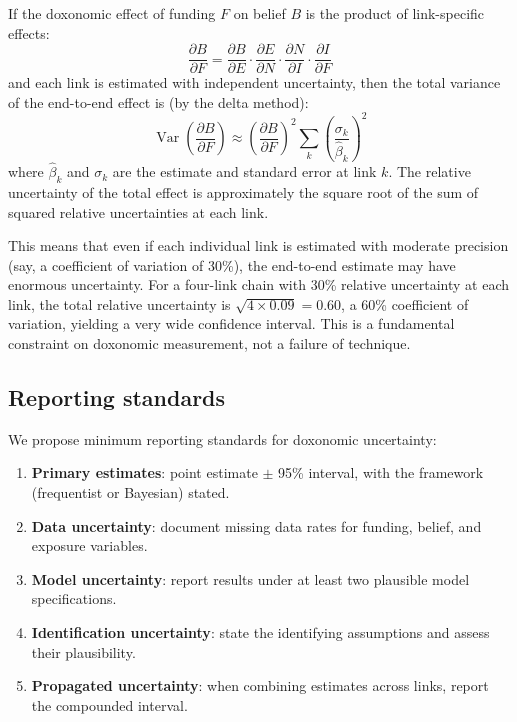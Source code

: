 \begin{proposition}
\label{prop:uncertainty-propagation}
If the doxonomic effect of funding $F$ on belief $B$ is the product of link-specific effects:
\[
  \frac{\partial B}{\partial F} = \frac{\partial B}{\partial E} \cdot \frac{\partial E}{\partial N} \cdot \frac{\partial N}{\partial I} \cdot \frac{\partial I}{\partial F}
\]
and each link is estimated with independent uncertainty, then the total variance of the end-to-end effect is (by the delta method):
\[
  \operatorname{Var}\!\left(\frac{\partial B}{\partial F}\right) \approx \left(\frac{\partial B}{\partial F}\right)^2 \sum_{k} \left(\frac{\sigma_k}{\hat{\beta}_k}\right)^2
\]
where $\hat{\beta}_k$ and $\sigma_k$ are the estimate and standard error at link $k$.
The relative uncertainty of the total effect is approximately the square root of the sum of squared relative uncertainties at each link.
\end{proposition}

This means that even if each individual link is estimated with moderate precision (say, a coefficient of variation of 30\%), the end-to-end estimate may have enormous uncertainty.
For a four-link chain with 30\% relative uncertainty at each link, the total relative uncertainty is $\sqrt{4 \times 0.09} = 0.60$, a 60\% coefficient of variation, yielding a very wide confidence interval.
This is a fundamental constraint on doxonomic measurement, not a failure of technique.

\subsection{Reporting standards}

We propose minimum reporting standards for doxonomic uncertainty:

\begin{enumerate}[nosep]
  \item \textbf{Primary estimates}: point estimate $\pm$ 95\% interval, with the framework (frequentist or Bayesian) stated.
  \item \textbf{Data uncertainty}: document missing data rates for funding, belief, and exposure variables.
  \item \textbf{Model uncertainty}: report results under at least two plausible model specifications.
  \item \textbf{Identification uncertainty}: state the identifying assumptions and assess their plausibility.
  \item \textbf{Propagated uncertainty}: when combining estimates across links, report the compounded interval.
\end{enumerate}


